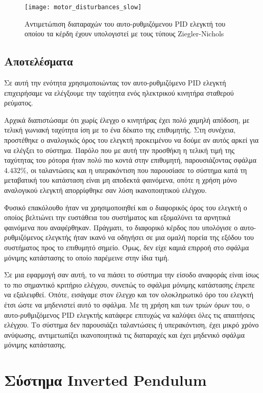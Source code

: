 \begin{figure}[h]
  \centering
  \texttt{[image: motor\_disturbances\_slow]}
  \caption{Αντιμετώπιση διαταραχών του αυτο-ρυθμιζόμενου PID ελεγκτή του οποίου τα κέρδη έχουν υπολογιστεί με τους τύπους Ziegler-Nichols}
  \label{fig:motor_disturbances_slow}
\end{figure}

\subsection{Αποτελέσματα}

Σε αυτή την ενότητα χρησιμοποιώντας τον αυτο-ρυθμιζόμενο PID ελεγκτή επιχειρήσαμε να ελέγξουμε την ταχύτητα ενός ηλεκτρικού κινητήρα σταθερού ρεύματος.

Αρχικά διαπιστώσαμε ότι χωρίς έλεγχο ο κινητήρας έχει πολύ χαμηλή απόδοση, με τελική γωνιακή ταχύτητα ίση με το ένα δέκατο της επιθυμητής. Στη συνέχεια, προστέθηκε ο αναλογικός όρος του ελεγκτή προκειμένου να δούμε αν αυτός αρκεί για να ελέγξει το σύστημα. Παρόλο που με αυτή την προσθήκη η τελική τιμή της ταχύτητας του ρότορα ήταν πολύ πιο κοντά στην επιθυμητή, παρουσιάζοντας σφάλμα $4.432\%$, οι ταλαντώσεις και η υπερακόντιση που παρουσίασε το σύστημα κατά τη μεταβατική του κατάσταση είναι μη αποδεκτά φαινόμενα, οπότε η χρήση μόνο αναλογικού ελεγκτή απορρίφθηκε σαν λύση ικανοποιητικού ελέγχου.

Φυσικό επακόλουθο ήταν να χρησιμοποιηθεί και ο διαφορικός όρος του ελεγκτή ο οποίος βελτιώνει την ευστάθεια του συστήματος και εξομαλύνει τα αρνητικά φαινόμενα που αναφέρθηκαν. Πράγματι, το διαφορικό κέρδος που υπολόγισε ο αυτο-ρυθμιζόμενος ελεγκτής ήταν ικανό να οδηγήσει σε μια ομαλή πορεία της εξόδου του συστήματος προς το επιθυμητό σημείο. Όμως, δεν είχε καμιά επιρροή στο σφάλμα μόνιμης κατάστασης το οποίο παρέμεινε στην ίδια τιμή.

Σε μια εφαρμογή σαν αυτή, το να πιάσει το σύστημα την είσοδο αναφοράς είναι ίσως το πιο σημαντικό κριτήριο ελέγχου, συνεπώς το σφάλμα μόνιμης κατάστασης έπρεπε να εξαλειφθεί. Οπότε, εισάγαμε στον έλεγχο και τον ολοκληρωτικό όρο του ελεγκτή έτσι ώστε να μηδενιστεί αυτό το σφάλμα. Με τη χρήση και των τριών όρων του, ο αυτο-ρυθμιζόμενος PID ελεγκτής κατάφερε επιτυχώς να καλύψει όλες τις απαιτήσεις ελέγχου. Το σύστημα δεν παρουσιάζει ταλαντώσεις ή υπερακόντιση, έχει μικρό χρόνο ανύψωσης, αντιμετωπίζει ικανοποιητικά τις διαταραχές και έχει μηδενικό σφάλμα μόνιμης κατάστασης.

\section{Σύστημα Inverted Pendulum}

